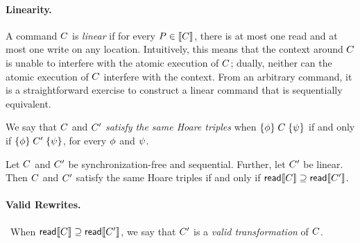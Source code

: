 \paragraph{Linearity.}
A command $C$ is \emph{linear} if for every $P\in\llbracket C\rrbracket$, there is
at most one read and at most one write on any location.  Intuitively, this
means that the context around $C$ is unable to interfere with the atomic
execution of $C$; dually, neither can the atomic execution of $C$
interfere with the context.  From an arbitrary command, it is a
straightforward exercise to construct a linear command that is sequentially
equivalent.

We say that $C$ and $C'$ \emph{satisfy the same Hoare triples} when
$\{\phi\}\allowbreak\;C\;\allowbreak\{\psi\}$ if and only if
$\{\phi\}\allowbreak\;C'\;\allowbreak\{\psi\}$, for every $\phi$ and $\psi$.

\begin{corollary}\label{seqcompleteness}
  Let $C$ and $C'$ be synchronization-free and sequential.  Further,
  let $C'$ be linear.
  Then $C$ and $C'$ satisfy the same Hoare
  triples if and only if $\mathsf{read}\llbracket C\rrbracket \supseteq \mathsf{read}\llbracket C'\rrbracket$.
%    
\end{corollary}

\paragraph{Valid Rewrites.}
\ When ${\mathsf{read}}\llbracket C\rrbracket \supseteq {\mathsf{read}}\llbracket C'\rrbracket$, we say that $C'$ is
a \emph{valid transformation} of $C$.

